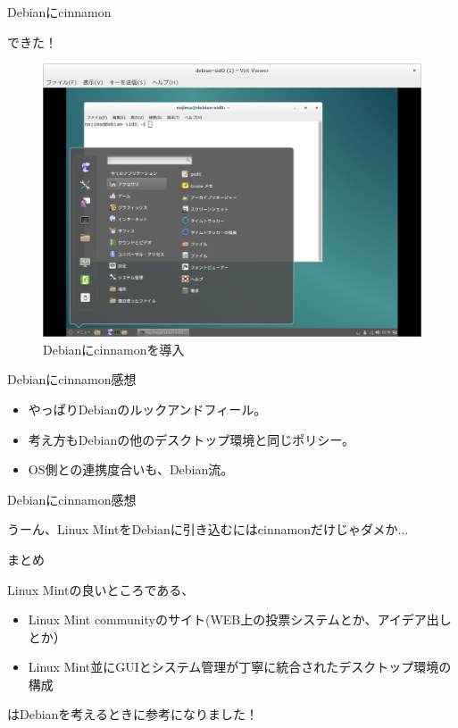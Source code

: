 \begin{frame}{Debianにcinnamon}

できた！

\begin{figure}[H]
\centering
\includegraphics[width=0.6\hsize]{image201412/debian-cinnamon.png}  
\caption{Debianにcinnamonを導入}\label{fig:debian-cinnamon}
\end{figure} 
  
\end{frame}  

\begin{frame}{Debianにcinnamon感想}

  \begin{itemize}
  \item やっぱりDebianのルックアンドフィール。
  \item 考え方もDebianの他のデスクトップ環境と同じポリシー。
  \item OS側との連携度合いも、Debian流。
  \end{itemize}
  
\end{frame}  

\begin{frame}{Debianにcinnamon感想}

  \centering
  うーん、Linux MintをDebianに引き込むにはcinnamonだけじゃダメか...
  
\end{frame}  

\begin{frame}{まとめ}

 Linux Mintの良いところである、
  
\begin{itemize}  
\item Linux Mint communityのサイト(WEB上の投票システムとか、アイデア出しとか）
\item Linux Mint並にGUIとシステム管理が丁寧に統合されたデスクトップ環境の構成
\end{itemize}

はDebianを考えるときに参考になりました！

\end{frame}  


